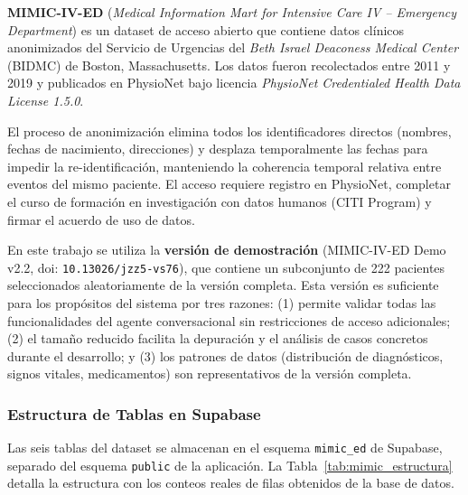 \textbf{MIMIC-IV-ED} (\textit{Medical Information Mart for Intensive Care IV -- Emergency Department}) es un dataset de acceso abierto que contiene datos clínicos anonimizados del Servicio de Urgencias del \textit{Beth Israel Deaconess Medical Center} (BIDMC) de Boston, Massachusetts. Los datos fueron recolectados entre 2011 y 2019 y publicados en PhysioNet \citep{Johnson2023MIMICED} bajo licencia \textit{PhysioNet Credentialed Health Data License 1.5.0}.

El proceso de anonimización elimina todos los identificadores directos (nombres, fechas de nacimiento, direcciones) y desplaza temporalmente las fechas para impedir la re-identificación, manteniendo la coherencia temporal relativa entre eventos del mismo paciente. El acceso requiere registro en PhysioNet, completar el curso de formación en investigación con datos humanos (CITI Program) y firmar el acuerdo de uso de datos.

En este trabajo se utiliza la \textbf{versión de demostración} (MIMIC-IV-ED Demo v2.2, doi: \texttt{10.13026/jzz5-vs76}), que contiene un subconjunto de 222 pacientes seleccionados aleatoriamente de la versión completa. Esta versión es suficiente para los propósitos del sistema por tres razones: (1) permite validar todas las funcionalidades del agente conversacional sin restricciones de acceso adicionales; (2) el tamaño reducido facilita la depuración y el análisis de casos concretos durante el desarrollo; y (3) los patrones de datos (distribución de diagnósticos, signos vitales, medicamentos) son representativos de la versión completa.

\subsubsection{Estructura de Tablas en Supabase}

Las seis tablas del dataset se almacenan en el esquema \texttt{mimic\_ed} de Supabase, separado del esquema \texttt{public} de la aplicación. La Tabla~\ref{tab:mimic_estructura} detalla la estructura con los conteos reales de filas obtenidos de la base de datos.

